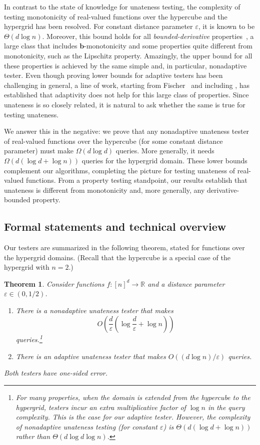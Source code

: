 \documentclass[11pt]{article}
\numberwithin{equation}{section}
\newtheorem{theorem}{Theorem}[section]
\theoremstyle{definition}
\theoremstyle{plain}
\newcommand{\R}{\mathbb R}
\newcommand{\eps}{\varepsilon}
\newcommand{\bb}{\ensuremath{\mathbf{b}}}
\begin{document}
In contrast to the state of knowledge for unateness testing, the complexity of testing monotonicity of real-valued functions over the hypercube and the hypergrid has been resolved. For constant distance parameter $\eps$, it is known to be $\Theta(d\log n)$. Moreover, this bound holds for all \emph{bounded-derivative} properties~\cite{CDJS17}, a large class that includes $\bb$-monotonicity and some properties quite different from monotonicity, such as the Lipschitz property. Amazingly, the upper bound for all these properties is achieved by the same simple and, in particular, nonadaptive tester.
Even though proving lower bounds for adaptive testers has been challenging in general, a line of work, starting from Fischer~\cite{Fis04} and including \cite{BBM12,CS14,CDJS17}, has established that adaptivity does not help for this large class of properties. Since unateness is so closely related, it is natural to ask whether the same is true for testing unateness.

We answer this in the negative: we prove that any nonadaptive unateness tester of real-valued functions over the hypercube (for some constant distance parameter) must make $\Omega(d\log d)$ queries.
More generally, it needs $\Omega(d(\log d+\log n))$ queries for the hypergrid domain. These lower bounds complement our algorithms, completing the picture for testing unateness of real-valued functions.
{}From a property testing standpoint, our results establish that unateness is different from
monotonicity and, more generally, any derivative-bounded
property.

\subsection{Formal statements and technical overview}
Our testers are summarized in the following theorem, stated for functions over the hypergrid domains. (Recall that the hypercube is a special case of the hypergrid with $n=2$.)

\begin{theorem}\label{thm:main-hg}
	Consider functions $f:[n]^d \to \R$ and a distance parameter $\eps\in (0,1/2)$.
	\begin{enumerate}
        \item\label{item:nonadaptive} There is a nonadaptive unateness tester that makes
          \[
            O\left(\frac d \eps\left(\log\frac d\eps + \log n\right)\right)
          \]
          queries.\footnote{For many properties, when the domain is
            extended from the hypercube to the hypergrid, testers
            incur an extra multiplicative factor of $\log n$ in the
            query complexity. This is the case for our adaptive
            tester.  However, the complexity of nonadaptive unateness
            testing (for constant $\eps$) is
            $\Theta(d(\log d + \log n))$ rather than
            $\Theta(d\log d\log n)$.}
		
		\item\label{item:adaptive} There is an adaptive unateness tester  that makes $O(({d\log n})/\eps)$ queries.
	\end{enumerate}
	Both testers have one-sided error.
\end{theorem}
\end{document}
